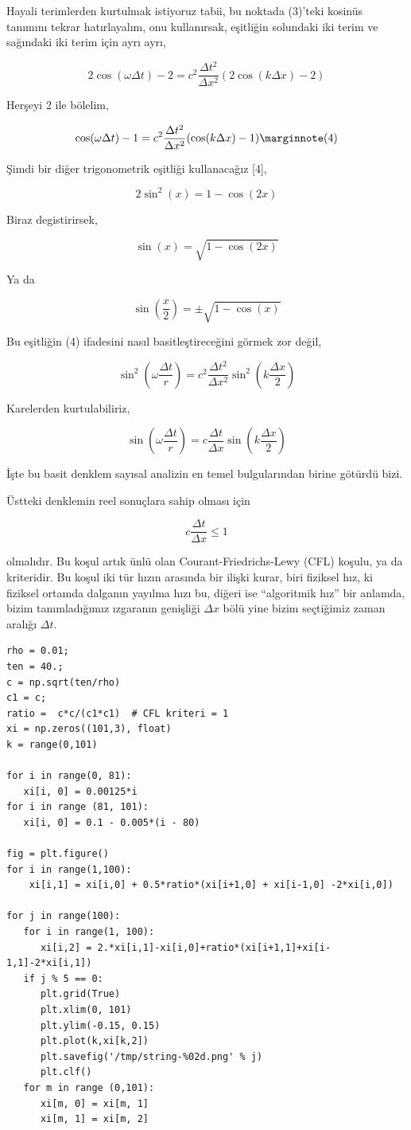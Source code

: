 \documentclass[12pt,fleqn]{article}\usepackage{../../common}
\begin{document}
Hayali terimlerden kurtulmak istiyoruz tabii, bu noktada (3)'teki kosinüs
tanımını tekrar hatırlayalım, onu kullanırsak, eşitliğin solundaki iki terim ve
sağındaki iki terim için ayrı ayrı,

$$
2 \cos(\omega \Delta t) - 2 = c^2 \frac{\Delta t^2}{\Delta x^2}
(2 \cos(k\Delta x) - 2)
$$

Herşeyi 2 ile bölelim,

$$
\cos(\omega \Delta t) - 1 = c^2 \frac{\Delta t^2}{\Delta x^2}
(\cos(k\Delta x) - 1)
\mlabel{4}
$$

Şimdi bir diğer trigonometrik eşitliği kullanacağız [4],

$$
2\sin^2(x) = 1 - \cos (2x)
$$

Biraz degistirirsek,

$$
\sin (x) = \sqrt{1 - \cos (2x)}
$$

Ya da

$$
\sin (\frac{x}{2}) = \pm \sqrt{1 - \cos (x)}
$$

Bu eşitliğin (4) ifadesini nasıl basitleştireceğini görmek zor değil,

$$
\sin^2(\omega \frac{\Delta t}{r}) =
c^2 \frac{\Delta t^2}{\Delta x^2} \sin^2 (k \frac{\Delta x}{2} )
$$

Karelerden kurtulabiliriz,

$$
\sin(\omega \frac{\Delta t}{r}) =
c \frac{\Delta t}{\Delta x} \sin (k \frac{\Delta x}{2} )
$$

İşte bu basit denklem sayısal analizin en temel bulgularından birine götürdü
bizi.

Üstteki denklemin reel sonuçlara sahip olması için

$$
c \frac{\Delta t}{\Delta x} \le 1
$$

olmalıdır. Bu koşul artık ünlü olan Courant-Friedrichs-Lewy (CFL) koşulu, ya da
kriteridir. Bu koşul iki tür hızın arasında bir ilişki kurar, biri fiziksel hız,
ki fiziksel ortamda dalganın yayılma hızı bu, diğeri ise ``algoritmik hız'' bir
anlamda, bizim tanımladığımız ızgaranın genişliği $\Delta x$ bölü yine bizim
seçtiğimiz zaman aralığı $\Delta t$.

\begin{verbatim}
rho = 0.01;
ten = 40.;
c = np.sqrt(ten/rho)               
c1 = c;
ratio =  c*c/(c1*c1)  # CFL kriteri = 1
xi = np.zeros((101,3), float)                            
k = range(0,101)

for i in range(0, 81):
   xi[i, 0] = 0.00125*i         
for i in range (81, 101):
   xi[i, 0] = 0.1 - 0.005*(i - 80) 

fig = plt.figure()  
for i in range(1,100): 
    xi[i,1] = xi[i,0] + 0.5*ratio*(xi[i+1,0] + xi[i-1,0] -2*xi[i,0])  
    
for j in range(100):
   for i in range(1, 100):              
      xi[i,2] = 2.*xi[i,1]-xi[i,0]+ratio*(xi[i+1,1]+xi[i-1,1]-2*xi[i,1])
   if j % 5 == 0:      
      plt.grid(True)
      plt.xlim(0, 101)
      plt.ylim(-0.15, 0.15)
      plt.plot(k,xi[k,2])
      plt.savefig('/tmp/string-%02d.png' % j)
      plt.clf()
   for m in range (0,101):
      xi[m, 0] = xi[m, 1]
      xi[m, 1] = xi[m, 2]
\end{verbatim}
\end{document}
